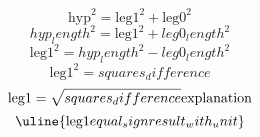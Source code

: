 \[\text{{{hyp}}}^{{2}}=\text{{{leg1}}}^{{2}}+\text{{{leg0}}}^{{2}}\]
\[{hyp_length}^{{2}}=\text{{{leg1}}}^{{2}}+{leg0_length}^{{2}}\]
\[\text{{{leg1}}}^{{2}}={hyp_length}^{{2}}-{leg0_length}^{{2}}\]
\[\text{{{leg1}}}^{{2}}={squares_difference}\]
\[\text{{{leg1}}}=\sqrt{{\mathstrut {squares_difference}}}\text{{{explanation}}}\]
\[\uline{{\text{{{leg1}}}{equal_sign}{result_with_unit}}}\]

